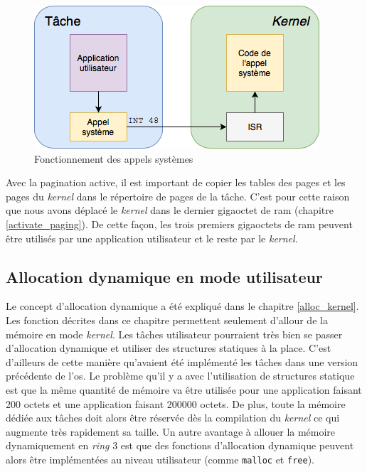 \begin{figure}[!h]
  \centering
  \includegraphics[scale=.75]{images/syscall.png}
  \caption{Fonctionnement des appels systèmes}
  \label{syscall}
\end{figure}

Avec la pagination active, il est important de copier les tables des pages et les
pages du \textit{kernel} dans le répertoire de pages de la tâche. C'est pour cette
raison que nous avons déplacé le \textit{kernel} dans le dernier gigaoctet de
\acrshort{ram} (chapitre \ref{activate_paging}). De cette façon, les trois premiers
gigaoctets de \acrshort{ram} peuvent être utilisés par une application utilisateur
et le reste par le \textit{kernel}.


\subsection{Allocation dynamique en mode utilisateur}
Le concept d'allocation dynamique a été expliqué dans le chapitre \ref{alloc_kernel}.
Les fonction décrites dans ce chapitre permettent seulement d'allour de la mémoire
en mode \textit{kernel}. Les tâches utilisateur pourraient très bien se passer
d'allocation dynamique et utiliser des structures statiques à la place. C'est
d'ailleurs de cette manière qu'avaient été implémenté les tâches dans une version
précédente de l'\acrshort{os}. Le problème qu'il y a avec l'utilisation de structures
statique est que la même quantité de mémoire va être utilisée pour une application
faisant 200 octets et une application faisant 200000 octets. De plus, toute la
mémoire dédiée aux tâches doit alors être réservée dès la compilation du \textit{kernel}
ce qui augmente très rapidement sa taille. Un autre avantage à allouer la mémoire
dynamiquement en \textit{ring} 3 est que des fonctions d'allocation dynamique 
peuvent alors être implémentées au niveau utilisateur (comme \texttt{malloc}
et \texttt{free}). \\

